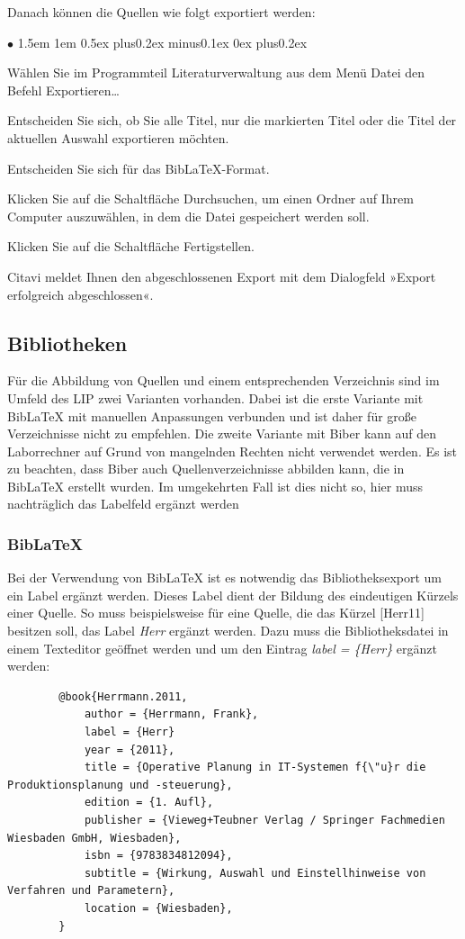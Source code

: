 \documentclass[13pt,a4paper, listof=entryprefix, bibliography=totocnumbered,toc=listofnumbered,lof=listofnumbered]{scrartcl}
\newcounter{verzeichnis}
\newenvironment{FHitemize}{\begin{list}{$\bullet$} {\leftmargin1.5em \labelsep1em \rightmargin0cm \parsep0.5ex plus0.2ex minus0.1ex \itemsep0ex plus0.2ex}}{\end{list}}
\begin{document}
Danach können die Quellen wie folgt exportiert werden:
\begin{FHitemize}
	\item Wählen Sie im Programmteil Literaturverwaltung aus dem Menü Datei den Befehl Exportieren…
	\item Entscheiden Sie sich, ob Sie alle Titel, nur die markierten Titel oder die Titel der aktuellen Auswahl exportieren möchten.
	\item Entscheiden Sie sich für das BibLaTeX-Format.
	\item Klicken Sie auf die Schaltfläche Durchsuchen, um einen Ordner auf Ihrem Computer auszuwählen, in dem die Datei gespeichert werden soll.
	\item Klicken Sie auf die Schaltfläche Fertigstellen.
	\item Citavi meldet Ihnen den abgeschlossenen Export mit dem Dialogfeld »Export erfolgreich abgeschlossen«.
\end{FHitemize}

\subsection{Bibliotheken}
Für die Abbildung von Quellen und einem entsprechenden Verzeichnis sind im Umfeld des \gls{LIP} zwei Varianten vorhanden. Dabei ist die erste Variante mit BibLaTeX mit manuellen Anpassungen verbunden und ist daher für große Verzeichnisse nicht zu empfehlen. Die zweite Variante mit Biber kann auf den Laborrechner auf Grund von mangelnden Rechten nicht verwendet werden. Es ist zu beachten, dass Biber auch Quellenverzeichnisse abbilden kann, die in BibLaTeX erstellt wurden. Im umgekehrten Fall ist dies nicht so, hier muss nachträglich das Labelfeld ergänzt werden

\subsubsection{BibLaTeX}
Bei der Verwendung von BibLaTeX ist es notwendig das Bibliotheksexport um ein Label ergänzt werden. Dieses Label dient der Bildung des eindeutigen Kürzels einer Quelle. So muss beispielsweise für eine Quelle, die das Kürzel [Herr11] besitzen soll, das Label \textit{Herr} ergänzt werden. Dazu muss die Bibliotheksdatei in einem Texteditor geöffnet werden und um den Eintrag \textit{label = \{Herr\}} ergänzt werden:

\begin{lstlisting}
		@book{Herrmann.2011,
			author = {Herrmann, Frank},
			label = {Herr}
			year = {2011},
			title = {Operative Planung in IT-Systemen f{\"u}r die Produktionsplanung und -steuerung},
			edition = {1. Aufl},
			publisher = {Vieweg+Teubner Verlag / Springer Fachmedien Wiesbaden GmbH, Wiesbaden},
			isbn = {9783834812094},
			subtitle = {Wirkung, Auswahl und Einstellhinweise von Verfahren und Parametern},
			location = {Wiesbaden},
		}
		\end{lstlisting}
\end{document}
